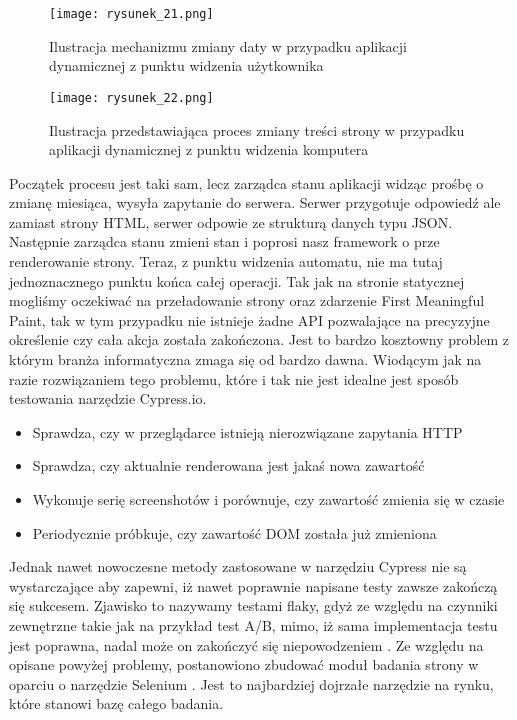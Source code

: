 \begin{figure}[htbp]
    \centering
    \texttt{[image: rysunek\_21.png]}
    \caption{Ilustracja mechanizmu zmiany daty w przypadku aplikacji dynamicznej z punktu widzenia użytkownika \cite{php-dynamic-app}}
    \label{fig:rysunek_21}
\end{figure}

\begin{figure}[htbp]
    \centering
    \texttt{[image: rysunek\_22.png]}
    \caption{Ilustracja przedstawiająca proces zmiany treści strony w przypadku aplikacji dynamicznej z punktu widzenia komputera}
    \label{fig:rysunek_22}
\end{figure}

Początek procesu jest taki sam, lecz zarządca stanu aplikacji widząc prośbę o zmianę miesiąca, wysyła zapytanie do serwera.
Serwer przygotuje odpowiedź ale zamiast strony HTML, serwer odpowie ze strukturą danych typu JSON.
Następnie zarządca stanu zmieni stan i poprosi nasz framework o prze renderowanie strony.
Teraz, z punktu widzenia automatu, nie ma tutaj jednoznacznego punktu końca całej operacji.
Tak jak na stronie statycznej mogliśmy oczekiwać na przeładowanie strony oraz zdarzenie First Meaningful Paint,
tak w tym przypadku nie istnieje żadne API pozwalające na precyzyjne określenie czy cała akcja została zakończona.
Jest to bardzo kosztowny problem z którym branża informatyczna zmaga się od bardzo dawna. Wiodącym jak na razie rozwiązaniem tego problemu,
które i tak nie jest idealne jest sposób testowania narzędzie Cypress.io.

\begin{itemize}
    \item Sprawdza, czy w przeglądarce istnieją nierozwiązane zapytania HTTP
    \item Sprawdza, czy aktualnie renderowana jest jakaś nowa zawartość
    \item Wykonuje serię screenshotów i porównuje, czy zawartość zmienia się w czasie
    \item Periodycznie próbkuje, czy zawartość DOM została już zmieniona
\end{itemize}

Jednak nawet nowoczesne metody zastosowane w narzędziu Cypress nie są wystarczające aby zapewni, iż nawet poprawnie napisane testy zawsze zakończą się sukcesem.
Zjawisko to nazywamy testami flaky, gdyż ze względu na czynniki zewnętrzne takie jak na przykład test A/B, mimo, iż sama implementacja testu jest poprawna,
nadal może on zakończyć się niepowodzeniem \cite{flaky-cypress}. Ze względu na opisane powyżej problemy, postanowiono zbudować moduł badania strony w oparciu o narzędzie Selenium \cite{selenium}.
Jest to najbardziej dojrzałe narzędzie na rynku, które stanowi bazę całego badania.

